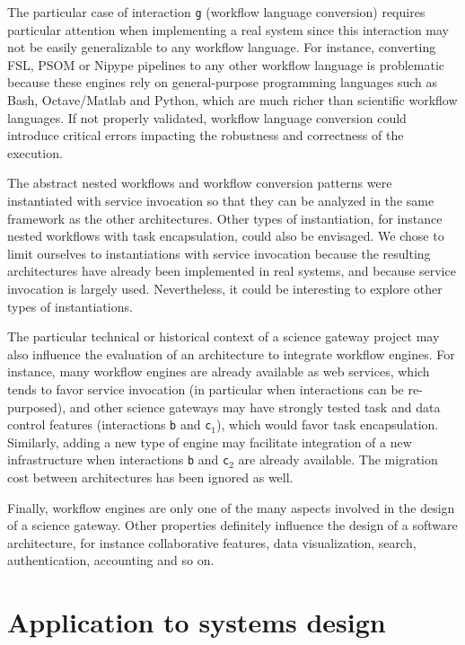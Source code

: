 \documentclass[preprint,3p,twocolumn]{elsarticle}
\newcommand{\correction}[1]{\color{blue}#1\color{black}\xspace}
\begin{document}
The particular case of interaction \texttt{g} (workflow language
conversion) requires particular attention when implementing a real
system since this interaction may not be easily generalizable to any
workflow language. For instance, converting FSL, PSOM or Nipype
pipelines to any other workflow language is problematic because these
engines rely on general-purpose programming languages such as Bash,
Octave/Matlab and Python, which are much richer than scientific
workflow languages. \correction{If not properly validated, workflow
  language conversion could introduce critical errors impacting the
  robustness and correctness of the execution. }

The abstract nested workflows and workflow conversion patterns were
instantiated with service invocation so that they can be analyzed in
the same framework as the other architectures. Other types of
instantiation, for instance nested workflows with task encapsulation,
could also be envisaged. We chose to limit ourselves to instantiations
with service invocation because the resulting architectures have already been
implemented in real systems, and because service invocation is largely
used. Nevertheless, it could be interesting to explore other types of
instantiations.

The particular technical or historical context of a science gateway
project may also influence the \correction{evaluation} of an
architecture to integrate workflow engines. For instance, many
workflow engines are already available as web services, which tends to
favor service invocation (\correction{in particular when interactions
  can be re-purposed}), and other science gateways may have strongly
tested task and data control features (interactions \texttt{b} and
\correction{\texttt{c$_1$}}), which would favor task
encapsulation. Similarly, adding a new type of engine may facilitate
integration of a new infrastructure when interactions \texttt{b} and
\texttt{c$_2$} are already available. The migration cost between
architectures has been ignored as well.

Finally, workflow engines are only one of the many aspects involved in
the design of a science gateway. Other properties definitely influence
the design of a software architecture, for instance collaborative
features, data visualization, search, authentication, accounting and
so on.

\correction{\section{Application to systems design}}
\label{sec:application}
\end{document}
